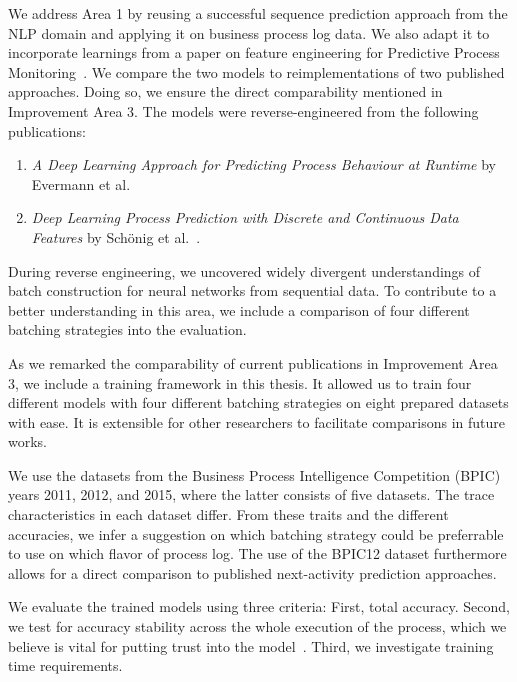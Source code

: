 We address Area 1 by reusing a successful sequence prediction approach from the NLP domain and applying it on business process log data. We also adapt it to incorporate learnings from a paper on feature engineering for Predictive Process Monitoring~\cite{klinkmuller2018reliablemonitoring}. We compare the two models to reimplementations of two published approaches. Doing so, we ensure the direct comparability mentioned in Improvement Area 3. The models were reverse-engineered from the following publications:

\begin{enumerate}
    \item\textit{A Deep Learning Approach for Predicting Process Behaviour at Runtime} by Evermann et al.~\cite{evermann2016}
    \item\textit{Deep Learning Process Prediction with Discrete and Continuous Data Features} by Schönig et al.~\cite{schoenig2018}.
\end{enumerate}

During reverse engineering, we uncovered widely divergent understandings of batch construction for neural networks from sequential data. To contribute to a better understanding in this area, we include a comparison of four different batching strategies into the evaluation.

As we remarked the comparability of current publications in Improvement Area 3, we include a training framework in this thesis. It allowed us to train four different models with four different batching strategies on eight prepared datasets with ease. It is extensible for other researchers to facilitate comparisons in future works.

We use the datasets from the Business Process Intelligence Competition (BPIC) years 2011, 2012, and 2015, where the latter consists of five datasets. The trace characteristics in each dataset differ. From these traits and the different accuracies, we infer a suggestion on which batching strategy could be preferrable to use on which flavor of process log. The use of the BPIC12 dataset furthermore allows for a direct comparison to published next-activity prediction approaches.

We evaluate the trained models using three criteria: First, total accuracy. Second, we test for accuracy stability across the whole execution of the process, which we believe is vital for putting trust into the model~\cite{francescomarino2015, boehmer2018probability}. Third, we investigate training time requirements.

